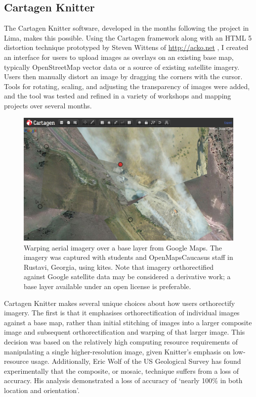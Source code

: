 \documentclass[11pt,oneside,notitlepage]{report}
\begin{document}
{{\subsection{Cartagen Knitter}
\label{subsubsec:knitter}

The Cartagen Knitter software, developed in the months following the project in Lima, makes this possible. Using the Cartagen framework along with an HTML 5 distortion technique prototyped by Steven Wittens of \href{acko.net}{http://acko.net} \cite{wittens2008projective}, I created an interface for users to upload images as overlays on an existing base map, typically OpenStreetMap vector data or a source of existing satellite imagery. Users then manually distort an image by dragging the corners with the cursor. Tools for rotating, scaling, and adjusting the transparency of images were added, and the tool was tested and refined in a variety of workshops and mapping projects over several months. 

\begin{figure}[h]
  \begin{center}
	\includegraphics[width=1\textwidth]{images/cartagen-in-action-rustavi.png}
	\caption{Warping aerial imagery over a base layer from Google Maps. The imagery was captured with students and OpenMapsCaucasus staff in Rustavi, Georgia, using kites. Note that imagery orthorectified against Google satellite data may be considered a derivative work; a base layer available under an open license is preferable.}
  \end{center}
\end{figure}

Cartagen Knitter makes several unique choices about how users orthorectify imagery. The first is that it emphasises orthorectification of individual images against a base map, rather than initial stitching of images into a larger composite image and subsequent orthorectification and warping of that larger image. This decision was based on the relatively high computing resource requirements of manipulating a single higher-resolution image, given Knitter's emphasis on low-resource usage. Additionally, Eric Wolf of the US Geological Survey has found experimentally that the composite, or mosaic, technique suffers from a loss of accuracy. His analysis demonstrated a loss of accuracy of `nearly 100\% in both location and orientation'. \cite{wolf2006lowcost}

}}
\end{document}
